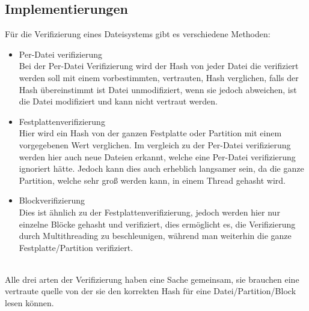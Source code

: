 \subsection{Implementierungen}
Für die Verifizierung eines Dateisystems gibt es verschiedene Methoden:
\begin{itemize}
\item Per-Datei verifizierung\\
  Bei der Per-Datei Verifizierung wird der Hash von jeder Datei die verifiziert werden soll mit einem vorbestimmten, vertrauten, Hash verglichen, falls der Hash übereinstimmt ist Datei unmodifiziert, wenn sie jedoch abweichen, ist die Datei modifiziert und kann nicht vertraut werden.
\item Festplattenverifizierung\\
  Hier wird ein Hash von der ganzen Festplatte oder Partition mit einem vorgegebenen Wert verglichen. Im vergleich zu der Per-Datei verifizierung werden hier auch neue Dateien erkannt, welche eine Per-Datei verifizierung ignoriert hätte. Jedoch kann dies auch erheblich langsamer sein, da die ganze Partition, welche sehr groß werden kann, in einem Thread gehasht wird.
\item Blockverifizierung\\
  Dies ist ähnlich zu der Festplattenverifizierung, jedoch werden hier nur einzelne Blöcke gehasht und verifiziert, dies ermöglicht es, die Verifizierung durch Multithreading zu beschleunigen, während man weiterhin die ganze Festplatte/Partition verifiziert.
\end{itemize}
\\
Alle drei arten der Verifizierung haben eine Sache gemeinsam, sie brauchen eine vertraute quelle von der sie den korrekten Hash für eine Datei/Partition/Block lesen können.


